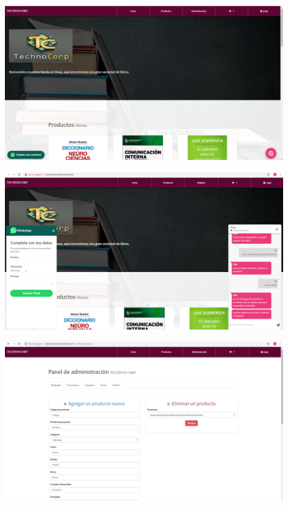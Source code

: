 \begin{flushleft}
\begin{itemize}
\begin{center}
	\includegraphics[width=12cm]{./Imagenes/web1} 
\end{center}
\begin{center}
	\includegraphics[width=12cm]{./Imagenes/web} 
\end{center}
\begin{center}
	\includegraphics[width=12cm]{./Imagenes/back} 
\end{center}








\end{itemize}
\end{flushleft}
